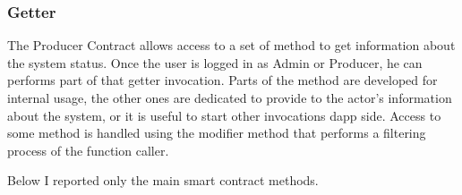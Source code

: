 \subsubsection{Getter}

The Producer Contract allows access to a set of method to get information about the system status.
Once the user is logged in as Admin or Producer, he can performs part of that getter invocation.
Parts of the method are developed for internal usage, the other ones are dedicated to provide to the actor's 
information about the system, or it is useful to start other invocations dapp side. Access to some method is 
handled using the modifier method that performs a filtering process of the function caller.
\bigskip 

Below I reported only the main smart contract methods.
\bigskip

